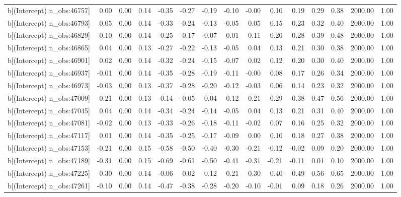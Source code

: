 \begin{table}[ht]
\begin{tabular}{rrrrrrrrrrrrrrr}
  b[(Intercept) n\_obs:46757] & 0.00 & 0.00 & 0.14 & -0.35 & -0.27 & -0.19 & -0.10 & -0.00 & 0.10 & 0.19 & 0.29 & 0.38 & 2000.00 & 1.00 \\ 
  b[(Intercept) n\_obs:46793] & 0.05 & 0.00 & 0.14 & -0.33 & -0.24 & -0.13 & -0.05 & 0.05 & 0.15 & 0.23 & 0.32 & 0.40 & 2000.00 & 1.00 \\ 
  b[(Intercept) n\_obs:46829] & 0.10 & 0.00 & 0.14 & -0.25 & -0.17 & -0.07 & 0.01 & 0.11 & 0.20 & 0.28 & 0.39 & 0.48 & 2000.00 & 1.00 \\ 
  b[(Intercept) n\_obs:46865] & 0.04 & 0.00 & 0.13 & -0.27 & -0.22 & -0.13 & -0.05 & 0.04 & 0.13 & 0.21 & 0.30 & 0.38 & 2000.00 & 1.00 \\ 
  b[(Intercept) n\_obs:46901] & 0.02 & 0.00 & 0.14 & -0.32 & -0.24 & -0.15 & -0.07 & 0.02 & 0.12 & 0.20 & 0.30 & 0.40 & 2000.00 & 1.00 \\ 
  b[(Intercept) n\_obs:46937] & -0.01 & 0.00 & 0.14 & -0.35 & -0.28 & -0.19 & -0.11 & -0.00 & 0.08 & 0.17 & 0.26 & 0.34 & 2000.00 & 1.00 \\ 
  b[(Intercept) n\_obs:46973] & -0.03 & 0.00 & 0.13 & -0.37 & -0.28 & -0.20 & -0.12 & -0.03 & 0.06 & 0.14 & 0.23 & 0.32 & 2000.00 & 1.00 \\ 
  b[(Intercept) n\_obs:47009] & 0.21 & 0.00 & 0.13 & -0.14 & -0.05 & 0.04 & 0.12 & 0.21 & 0.29 & 0.38 & 0.47 & 0.56 & 2000.00 & 1.00 \\ 
  b[(Intercept) n\_obs:47045] & 0.04 & 0.00 & 0.14 & -0.34 & -0.24 & -0.14 & -0.05 & 0.04 & 0.13 & 0.21 & 0.31 & 0.40 & 2000.00 & 1.00 \\ 
  b[(Intercept) n\_obs:47081] & -0.02 & 0.00 & 0.13 & -0.33 & -0.26 & -0.18 & -0.11 & -0.02 & 0.07 & 0.16 & 0.25 & 0.32 & 2000.00 & 1.00 \\ 
  b[(Intercept) n\_obs:47117] & 0.01 & 0.00 & 0.14 & -0.35 & -0.25 & -0.17 & -0.09 & 0.00 & 0.10 & 0.18 & 0.27 & 0.38 & 2000.00 & 1.00 \\ 
  b[(Intercept) n\_obs:47153] & -0.21 & 0.00 & 0.15 & -0.58 & -0.50 & -0.40 & -0.30 & -0.21 & -0.12 & -0.02 & 0.09 & 0.20 & 2000.00 & 1.00 \\ 
  b[(Intercept) n\_obs:47189] & -0.31 & 0.00 & 0.15 & -0.69 & -0.61 & -0.50 & -0.41 & -0.31 & -0.21 & -0.11 & 0.01 & 0.10 & 2000.00 & 1.00 \\ 
  b[(Intercept) n\_obs:47225] & 0.30 & 0.00 & 0.14 & -0.06 & 0.02 & 0.12 & 0.21 & 0.30 & 0.40 & 0.49 & 0.56 & 0.65 & 2000.00 & 1.00 \\ 
  b[(Intercept) n\_obs:47261] & -0.10 & 0.00 & 0.14 & -0.47 & -0.38 & -0.28 & -0.20 & -0.10 & -0.01 & 0.09 & 0.18 & 0.26 & 2000.00 & 1.00 \\ 

\end{tabular}
\end{table}
